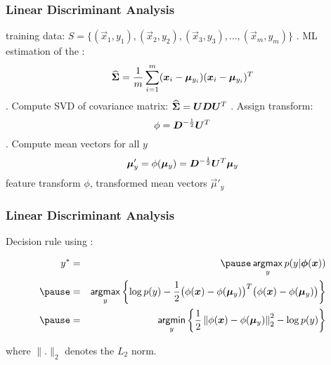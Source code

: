 \begin{frame}
  \frametitle{Linear Discriminant Analysis}

  \begin{algorithmic}
    \STATE {} training data:  $S = \{ (\vec x_1, y_1), (\vec x_2, y_2), (\vec x_3, y_3), \dots, (\vec x_m, y_m) \}$
      \pause
    . ML estimation of the :
      \begin{displaymath}
        \widehat{{\bm \Sigma}}= \frac{1}{m} \sum_{i=1}^m ({\bm x}_i - {\bm \mu}_{y_i})({\bm x}_i - {\bm \mu}_{y_i})^T
      \end{displaymath}
      \pause
     . Compute SVD of covariance matrix: $\widehat{{\bm \Sigma}}= {\bm U}{\bm D}{\bm U}^T$ \pause 
     . Assign transform: 
       \begin{displaymath}
         \phi= {\bm D}^{-\frac{1}{2}} {\bm U}^T
       \end{displaymath}
       \pause
     . Compute mean vectors for all $y$
       \begin{displaymath}
          {\bm \mu}'_y = \phi({\bm \mu}_y)= {\bm D}^{-\frac{1}{2}} {\bm U}^T {\bm \mu}_y
       \end{displaymath}
       \pause \vspace{-.5cm}
     \STATE {} feature transform $\phi$, transformed mean vectors $\vec{\mu}'_y$
  \end{algorithmic}
\end{frame}


\begin{frame}
  \frametitle{Linear Discriminant Analysis \cont}

  Decision rule using :

  \begin{eqnarray*}
    y^* &=& \pause \argmax_y p(y|\vec \phi(\vec x))\\ \pause
        &=& \argmax_y 
              \left\{ 
                \log p(y) - \frac{1}{2} \big( \phi(\vec x) - \phi(\vec\mu_y) \big)^T \big( \phi(\vec x)-\phi(\vec\mu_y) \big)
              \right\} \\ \pause
        &=& \argmin_y \left\{ \frac{1}{2}\left\|\phi(\vec x)-\phi(\vec\mu_y) \right\|_2^2 - \log p(y) \right\}
  \end{eqnarray*}

  where $\|.\|_2$ denotes the $L_2$ norm.
\end{frame}


